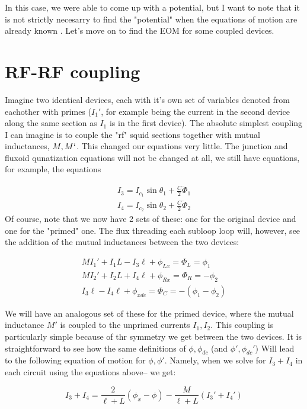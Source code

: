 \documentclass[paper=a4, twocolumn, fontsize=10pt]{article} %
\numberwithin{equation}{section} %
\numberwithin{figure}{section} %
\numberwithin{table}{section} %
\begin{document}
 In this case, we were able to come up with a potential, but I want to note that it is not strictly necesarry to find the "potential" when the equations of motion are already known . Let's move on to find the EOM for some coupled devices.


\section{ RF-RF coupling}

Imagine two identical devices, each with it's own set of variables denoted from eachother with primes ($I_1'$, for example being the current in the second device along the same section as $I_1$ is in the first device). The absolute simplest coupling I can imagine is to couple the "rf" squid sections together with mutual inductances, $M, M`$. This changed our equations very little. The junction and fluxoid qunatization equations will not be changed at all, we still have equations, for example, the equations

\begin{align}
    I_3 = I_{c_1} \sin \theta_1 + \frac{C}{2} \ddot{\Phi}_1
    \\ 
    I_4 = I_{c_2} \sin \theta_2 + \frac{C}{2} \ddot{\Phi}_2 
    \end{align}
Of course, note that we now have 2 sets of these: one for the original device and one for the "primed" one.  The flux threading each subloop loop will, however, see the addition of the mutual inductances between the two devices:

\begin{align}
    MI_1' + I_1 L - I_3 \ell + \phi_{Lx} = \Phi_{L} = \phi_1
    \\
    MI_2' + I_2 L + I_4 \ell + \phi_{Rx} = \Phi_{R} = -\phi_2
    \\
    I_3 \ell - I_4 \ell + \phi_{xdc} = \Phi_{C} = -(\phi_1 - \phi_2)
\end{align} 

We will have an analogous set of these for the primed device, where the mutual inductance $M'$ is coupled to the unprimed currents $I_1, I_2$. This coupling is particularly simple because of thr symmetry we get between the two devices. It is straightforward to see how the same definitions of $\phi,\phi_{dc}$ (and $\phi',\phi_{dc}'$) Will lead to the following equation of motion for $\phi,\phi'$. Namely, when we solve for $I_3+I_4$ in each circuit using the equations above-- we get:

\[ I_3 + I_4 = \frac{2}{\ell+L}\left(\phi_x - \phi \right) - \frac{M}{\ell+L} (I_3'+I_4') \]
\end{document}
